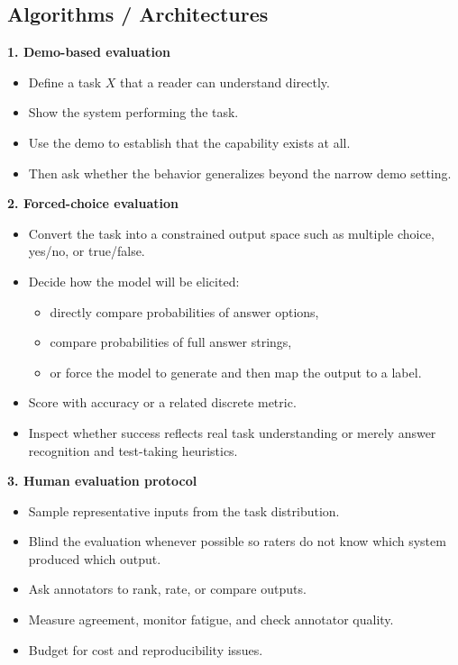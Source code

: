 \documentclass[11pt]{article}
\begin{document}
\subsection{Algorithms / Architectures}
\textbf{1. Demo-based evaluation}
\begin{itemize}
    \item Define a task \(X\) that a reader can understand directly.
    \item Show the system performing the task.
    \item Use the demo to establish that the capability exists at all.
    \item Then ask whether the behavior generalizes beyond the narrow demo setting.
\end{itemize}

\textbf{2. Forced-choice evaluation}
\begin{itemize}
    \item Convert the task into a constrained output space such as multiple choice, yes/no, or true/false.
    \item Decide how the model will be elicited:
    \begin{itemize}
        \item directly compare probabilities of answer options,
        \item compare probabilities of full answer strings,
        \item or force the model to generate and then map the output to a label.
    \end{itemize}
    \item Score with accuracy or a related discrete metric.
    \item Inspect whether success reflects real task understanding or merely answer recognition and test-taking heuristics.
\end{itemize}

\textbf{3. Human evaluation protocol}
\begin{itemize}
    \item Sample representative inputs from the task distribution.
    \item Blind the evaluation whenever possible so raters do not know which system produced which output.
    \item Ask annotators to rank, rate, or compare outputs.
    \item Measure agreement, monitor fatigue, and check annotator quality.
    \item Budget for cost and reproducibility issues.
\end{itemize}
\end{document}
